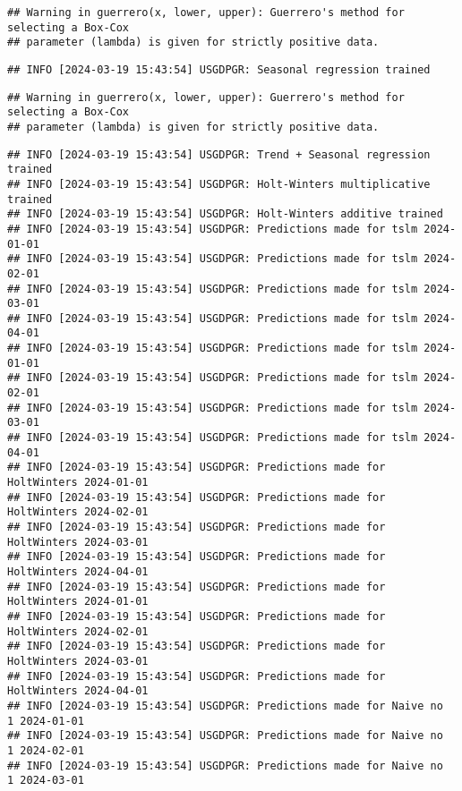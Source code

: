 \documentclass[
]{article}
\begin{document}
\begin{verbatim}
## Warning in guerrero(x, lower, upper): Guerrero's method for selecting a Box-Cox
## parameter (lambda) is given for strictly positive data.
\end{verbatim}

\begin{verbatim}
## INFO [2024-03-19 15:43:54] USGDPGR: Seasonal regression trained
\end{verbatim}

\begin{verbatim}
## Warning in guerrero(x, lower, upper): Guerrero's method for selecting a Box-Cox
## parameter (lambda) is given for strictly positive data.
\end{verbatim}

\begin{verbatim}
## INFO [2024-03-19 15:43:54] USGDPGR: Trend + Seasonal regression trained
## INFO [2024-03-19 15:43:54] USGDPGR: Holt-Winters multiplicative trained
## INFO [2024-03-19 15:43:54] USGDPGR: Holt-Winters additive trained
## INFO [2024-03-19 15:43:54] USGDPGR: Predictions made for tslm 2024-01-01
## INFO [2024-03-19 15:43:54] USGDPGR: Predictions made for tslm 2024-02-01
## INFO [2024-03-19 15:43:54] USGDPGR: Predictions made for tslm 2024-03-01
## INFO [2024-03-19 15:43:54] USGDPGR: Predictions made for tslm 2024-04-01
## INFO [2024-03-19 15:43:54] USGDPGR: Predictions made for tslm 2024-01-01
## INFO [2024-03-19 15:43:54] USGDPGR: Predictions made for tslm 2024-02-01
## INFO [2024-03-19 15:43:54] USGDPGR: Predictions made for tslm 2024-03-01
## INFO [2024-03-19 15:43:54] USGDPGR: Predictions made for tslm 2024-04-01
## INFO [2024-03-19 15:43:54] USGDPGR: Predictions made for HoltWinters 2024-01-01
## INFO [2024-03-19 15:43:54] USGDPGR: Predictions made for HoltWinters 2024-02-01
## INFO [2024-03-19 15:43:54] USGDPGR: Predictions made for HoltWinters 2024-03-01
## INFO [2024-03-19 15:43:54] USGDPGR: Predictions made for HoltWinters 2024-04-01
## INFO [2024-03-19 15:43:54] USGDPGR: Predictions made for HoltWinters 2024-01-01
## INFO [2024-03-19 15:43:54] USGDPGR: Predictions made for HoltWinters 2024-02-01
## INFO [2024-03-19 15:43:54] USGDPGR: Predictions made for HoltWinters 2024-03-01
## INFO [2024-03-19 15:43:54] USGDPGR: Predictions made for HoltWinters 2024-04-01
## INFO [2024-03-19 15:43:54] USGDPGR: Predictions made for Naive no  1 2024-01-01
## INFO [2024-03-19 15:43:54] USGDPGR: Predictions made for Naive no  1 2024-02-01
## INFO [2024-03-19 15:43:54] USGDPGR: Predictions made for Naive no  1 2024-03-01

\end{verbatim}
\end{document}
